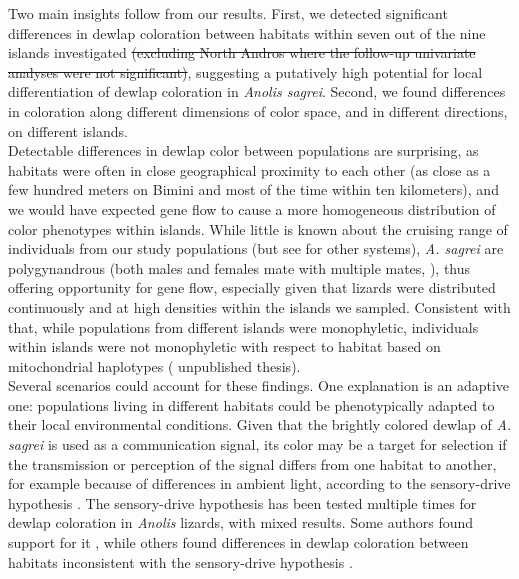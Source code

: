Two main insights follow from our results. First, we detected significant differences in dewlap coloration between habitats within seven out of the nine islands investigated \sout{(excluding North Andros where the follow-up univariate analyses were not significant)}, suggesting a putatively high potential for local differentiation of dewlap coloration in \textit{Anolis sagrei}. Second, we found differences in coloration along different dimensions of color space, and in different directions, on different islands.\\

Detectable differences in dewlap color between populations are surprising, as habitats were often in close geographical proximity to each other (as close as a few hundred meters on Bimini and most of the time within ten kilometers), and we would have expected gene flow to cause a more homogeneous distribution of color phenotypes within islands. While little is known about the cruising range of individuals from our study populations (but see \citealt{Steinberg2017, Kamath2018} for other systems), \textit{A. sagrei} are polygynandrous (both males and females mate with multiple mates, \citealt{Kamath2017a, Kamath2018a, Kamath2018}), thus offering opportunity for gene flow, especially given that lizards were distributed continuously and at high densities within the islands we sampled. Consistent with that, while populations from different islands were monophyletic, individuals within islands were not monophyletic with respect to habitat based on mitochondrial haplotypes (\citealt{vandeSchoot2016} unpublished thesis).\\

Several scenarios could account for these findings. One explanation is an adaptive one: populations living in different habitats could be phenotypically adapted to their local environmental conditions. Given that the brightly colored dewlap of \textit{A. sagrei} is used as a communication signal, its color may be a target for selection if the transmission or perception of the signal differs from one habitat to another, for example because of differences in ambient light, according to the sensory-drive hypothesis \citep{Endler1988, Endler1992, Endler1998}. The sensory-drive hypothesis has been tested multiple times for dewlap coloration in \textit{Anolis} lizards, with mixed results. Some authors found support for it \citep{Leal2002, Leal2004}, while others found differences in dewlap coloration between habitats inconsistent with the sensory-drive hypothesis \citep{Fleishman2009, Ng2012}.\\

